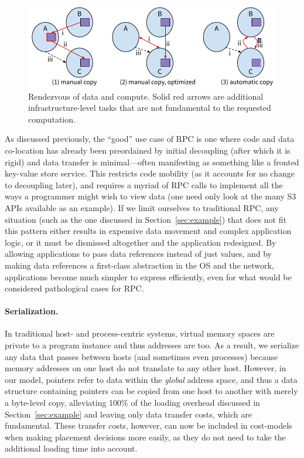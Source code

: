 {    \begin{figure}
        \centering
        \includegraphics[width=\linewidth]{fig/copy}
        \caption{Rendezvous of data and compute. Solid red arrows are additional
            infrastructure-level tasks that are not fundamental to the requested computation.}
        \label{fig:rpccopy}
    \end{figure}

    As discussed previously, the ``good'' use case of RPC is one where code and data
    co-location has already been preordained by initial decoupling (after which it is rigid) and
    data transfer is minimal---often manifesting as something like a fronted key-value store service. This restricts
    code mobility (as it accounts for no change to decoupling later), and requires a myriad of RPC calls
    to implement all the ways a programmer might wish to view data (one need only look at the many S3
    APIs available as an example).
    If we limit ourselves to traditional RPC, any situation (such as the one discussed in
    Section~\ref{sec:example}) that does not fit this pattern either results in expensive data movement
    and complex application logic, or it must be dismissed altogether and the application redesigned.
    By allowing applications to pass data references instead of just values, and by making data
    references a first-class abstraction in the OS and the network, applications become much simpler to
    express efficiently, even for what would be considered pathological cases for RPC.

    \paragraph*{Serialization.}
    In traditional host- and process-centric systems, virtual memory spaces are private to a
    program instance and thus addresses are too. As a result, we serialize any data that passes between
    hosts (and sometimes even processes) because memory addresses on one host do not translate to any
    other host. However, in our model, pointers refer to data within the \emph{global} address space,
    and thus a data structure containing pointers can be copied from one host to another with merely a
    byte-level copy, alleviating 100\% of the loading overhead discussed in Section~\ref{sec:example}
    and leaving only data transfer costs, which are fundamental. These transfer costs, however, can now
    be included in cost-models when making placement decisions more easily, as they do not need to take
    the additional loading time into account.

}


